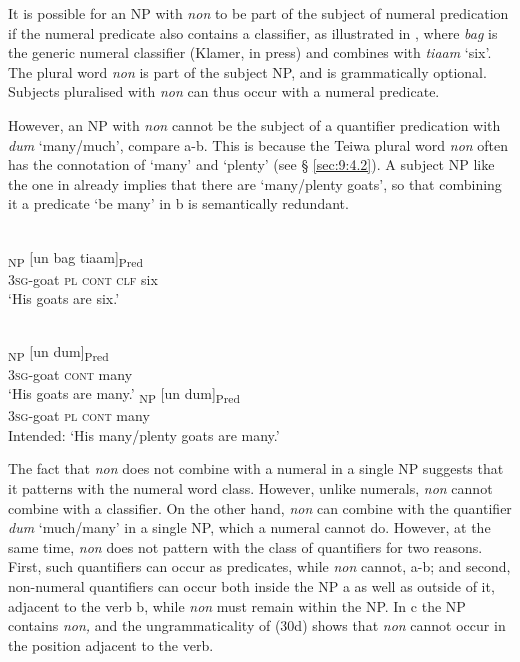 It is possible for an NP with \textit{non} to be part of the subject of numeral predication if the numeral predicate also contains a classifier, as illustrated in , where \textit{bag} is the generic numeral classifier (Klamer, in press) and combines with \textit{tiaam} `six'. The plural word \textit{non} is part of the subject NP, and is grammatically optional. Subjects pluralised with \textit{non} can thus occur with a numeral predicate.

However, an NP with \textit{non} cannot be the subject of a quantifier predication with \textit{dum} `many/much', compare a-b. This is because the Teiwa plural word \textit{non} often has the connotation of `many' and `plenty' (see {\S} \ref{sec:9:4.2}). A subject NP like the one in  already implies that there are `many/plenty goats', so that combining it a predicate `be many' in b is semantically redundant.


\ea%
\label{ex:9:27}
 \\
\textsubscript{NP} [{un} bag {tiaam}]\textsubscript{Pred} \\
    \textsc{3sg}-goat \textsc{pl} \textsc{cont} \textsc{clf} six \\
\glt `His goats are six.'
\z







\ea%
\label{ex:9:28}
 \\
\ea
\gll [{Ga-qavif}]\textsubscript{NP} [un dum]\textsubscript{Pred}  \\
 \textsc{3sg}-goat \textsc{cont} many   \\
\glt `His goats are many.'
\ex
{}\textsubscript{NP} [un dum]\textsubscript{Pred}  \\
    \textsc{3sg}-goat \textsc{pl} \textsc{cont} many\\
\glt Intended: `His many/plenty goats are many.'
\z
\z






The fact that \textit{non} does not combine with a numeral in a single NP suggests that it patterns with the numeral word class. However, unlike numerals, \textit{non} cannot combine with a classifier. On the other hand, \textit{non} can combine with the quantifier \textit{dum} `much/many' in a single NP, which a numeral cannot do. However, at the same time, \textit{non} does not pattern with the class of quantifiers for two reasons. First, such quantifiers can occur as predicates, while \textit{non} cannot, a-b; and second, non-numeral quantifiers can occur both inside the NP a as well as outside of it, adjacent to the verb b, while \textit{non} must remain within the NP. In c the NP contains \textit{non,} and the ungrammaticality of (30d) shows that \textit{non} cannot occur in the position adjacent to the verb.


